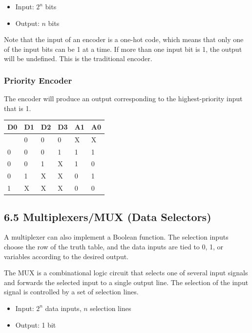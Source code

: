 \documentclass[11pt,a4paper]{article}
\providecommand{\tightlist}{\setlength{\itemsep}{1pt}\setlength{\parskip}{0pt}}
\begin{document}
\begin{itemize}
\tightlist
\item
  Input: \(2^n\) bits
\item
  Output: \(n\) bits
\end{itemize}

Note that the input of an encoder is a one-hot code, which means that
only one of the input bits can be 1 at a time. If more than one input
bit is 1, the output will be undefined. This is the traditional encoder.

\subsubsection{Priority Encoder}\label{priority-encoder}

The encoder will produce an output corresponding to the highest-priority
input that is 1.

\begin{longtable}[]{@{}llllll@{}}
\toprule\noalign{}
D0 & D1 & D2 & D3 & A1 & A0 \\
\midrule\noalign{}
\endhead
\bottomrule\noalign{}
\endlastfoot
0 & 0 & 0 & 0 & X & X \\
0 & 0 & 0 & 1 & 1 & 1 \\
0 & 0 & 1 & X & 1 & 0 \\
0 & 1 & X & X & 0 & 1 \\
1 & X & X & X & 0 & 0 \\
\end{longtable}

\subsection{6.5 Multiplexers/MUX (Data
Selectors)}\label{multiplexersmux-data-selectors}

A multiplexer can also implement a Boolean function. The selection
inputs choose the row of the truth table, and the data inputs are tied
to 0, 1, or variables according to the desired output.

The MUX is a combinational logic circuit that selects one of several
input signals and forwards the selected input to a single output line.
The selection of the input signal is controlled by a set of selection
lines.

\begin{itemize}
\tightlist
\item
  Input: \(2^n\) data inputs, \(n\) selection lines
\item
  Output: 1 bit
\end{itemize}
\end{document}
